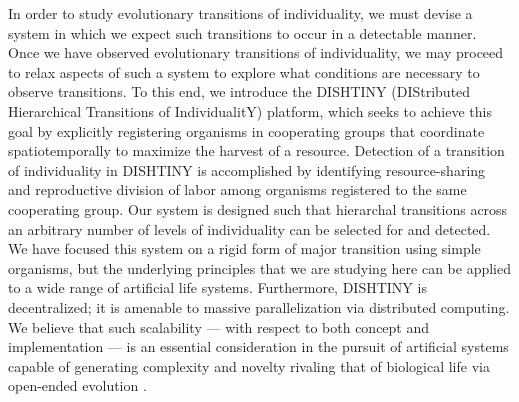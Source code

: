 In order to study evolutionary transitions of individuality, we must devise a system in which we expect such transitions to occur in a detectable manner.
Once we have observed evolutionary transitions of individuality, we may proceed to relax aspects of such a system to explore what conditions are necessary to observe transitions.
To this end, we introduce the DISHTINY (DIStributed Hierarchical Transitions of IndividualitY) platform, which seeks to achieve this goal by explicitly registering organisms in cooperating groups that coordinate spatiotemporally to maximize the harvest of a resource.
Detection of a transition of individuality in DISHTINY is accomplished by identifying resource-sharing and reproductive division of labor among organisms registered to the same cooperating group.
Our system is designed such that hierarchal transitions across an arbitrary number of levels of individuality can be selected for and detected.
We have focused this system on a rigid form of major transition using simple organisms, but the underlying principles that we are studying here can be applied to a wide range of artificial life systems.
Furthermore, DISHTINY is decentralized;
it is amenable to massive parallelization via distributed computing.
We believe that such scalability --- with respect to both concept and implementation --- is an essential consideration in the pursuit of artificial systems capable of generating complexity and novelty rivaling that of biological life via open-ended evolution \citep{ackley2011pursue, ackley2016indefinite}.

